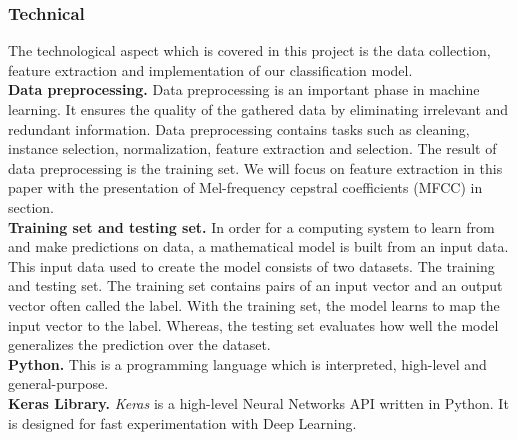 \subsubsection{Technical} The technological aspect which is covered in this
project is the data collection, feature extraction and implementation of our
classification model. \\

\textbf{Data preprocessing.} Data preprocessing is an important phase in machine
learning. It ensures the quality of the gathered data by eliminating irrelevant
and redundant information. Data preprocessing contains tasks such as cleaning,
instance selection, normalization, feature extraction and selection. The result
of data preprocessing is the training set. We will focus on feature extraction
in this paper with the presentation of Mel-frequency cepstral coefficients
(MFCC) in section.\\


\textbf{Training set and testing set.} In order for a computing system to learn
from and make predictions on data, a mathematical model is built from an input
data. This input data used to create the model consists of two datasets. The
training and testing set. The training set contains pairs of an input vector and
an output vector often called the label. With the training set, the model learns
to map the input vector to the label. Whereas, the testing set evaluates how
well the model generalizes the prediction over the dataset.\\

\textbf{Python.} This is a programming language which is interpreted, high-level
and general-purpose.~\cite{Python}\\

\textbf{Keras Library.} \textit{Keras} is a high-level Neural Networks API
written in Python. It is designed for fast experimentation with Deep
Learning.~\cite{chollet2015keras}
